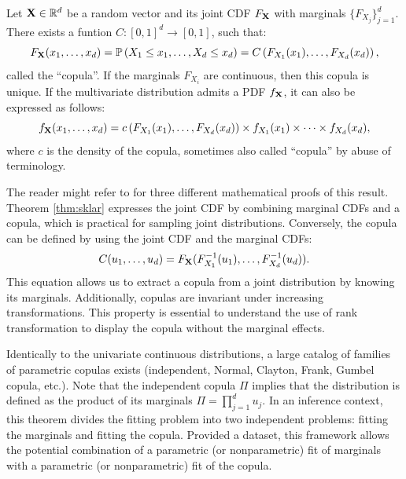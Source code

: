 \begin{theorem}
    Let $\mathbf{X} \in \mathbb{R}^d$ be a random vector and its joint CDF $F_{{\bf X}}$ with marginals $\{F_{X_j}\}_{j=1}^d$. There exists a funtion $C: [0, 1]^d \rightarrow [0, 1]$, such that:
    \begin{equation}
        F_{{\bf X}}(x_1, \dots, x_d) = \mathbb{P}\left(X_1\leq x_1,\dots ,X_d\leq x_d\right) = C\left(F_{X_1}(x_1), \dots, F_{X_d}(x_d)\right), 
    \end{equation}
    called the ``copula''. 
    If the marginals $F_{X_i}$ are continuous, then this copula is unique. 
    If the multivariate distribution admits a PDF $f_{{\bf X}}$, it can also be expressed as follows:
    \begin{equation}
        f_{{\bf X}}(x_1, \dots, x_d) = c\left(F_{X_1}(x_1), \dots, F_{X_d}(x_d)\right) \times f_{X_1}(x_1) \times \dots \times f_{X_d}(x_d),
    \end{equation}
    where $c$ is the density of the copula, sometimes also called ``copula'' by abuse of terminology. 
    \label{thm:sklar}
\end{theorem}

The reader might refer to \citet[Chap. 2]{durante_2015_copula} for three different mathematical proofs of this result. 
Theorem \ref{thm:sklar} expresses the joint CDF by combining marginal CDFs and a copula, which is practical for sampling joint distributions. 
Conversely, the copula can be defined by using the joint CDF and the marginal CDFs: 
\begin{equation}
    C(u_1, \dots, u_d) = F_{{\bf X}}(F^{-1}_{X_1}(u_1), \dots, F^{-1}_{X_d}(u_d)).
\end{equation}
This equation allows us to extract a copula from a joint distribution by knowing its marginals.
Additionally, copulas are invariant under increasing transformations. 
This property is essential to understand the use of rank transformation to display the copula without the marginal effects.     

Identically to the univariate continuous distributions, a large catalog of families of parametric copulas exists (independent, Normal, Clayton, Frank, Gumbel copula, etc.). 
Note that the independent copula $\Pi$ implies that the distribution is defined as the product of its marginals $\Pi = \prod_{j=1}^d u_j$. 
In an inference context, this theorem divides the fitting problem into two independent problems: fitting the marginals and fitting the copula. 
Provided a dataset, this framework allows the potential combination of a parametric (or nonparametric) fit of marginals with a parametric (or nonparametric) fit of the copula. 

